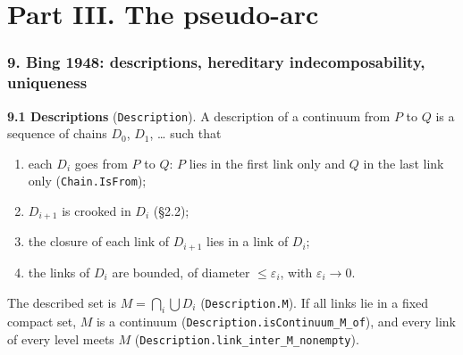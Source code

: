 \documentclass[11pt]{article}
\newcommand{\lean}[1]{\texttt{#1}}
\begin{document}
\bigskip

\part*{Part III. The pseudo-arc}

\section*{9. Bing 1948: descriptions, hereditary indecomposability, uniqueness}

\textbf{9.1 Descriptions} (\lean{Description}). A description of a continuum from $P$ to $Q$ is a sequence of chains $D_0$, $D_1$, \dots{} such that

\begin{enumerate}
  \item[1.] each $D_i$ goes from $P$ to $Q$: $P$ lies in the first link only and $Q$ in the last link only (\lean{Chain.\hspace{0pt}IsFrom});
  \item[2.] $D_{i+1}$ is crooked in $D_i$ (\S{}2.2);
  \item[3.] the closure of each link of $D_{i+1}$ lies in a link of $D_i$;
  \item[4.] the links of $D_i$ are bounded, of diameter $\leq \varepsilon_i$, with $\varepsilon_i \to 0$.
\end{enumerate}

The described set is $M = \bigcap_i \bigcup D_i$ (\lean{Description.\hspace{0pt}M}). If all links lie in a fixed compact set, $M$ is a continuum (\lean{Description.\hspace{0pt}isContinuum\_\hspace{0pt}M\_\hspace{0pt}of}), and every link of every level meets $M$ (\lean{Description.\hspace{0pt}link\_\hspace{0pt}inter\_\hspace{0pt}M\_\hspace{0pt}nonempty}).
\end{document}
